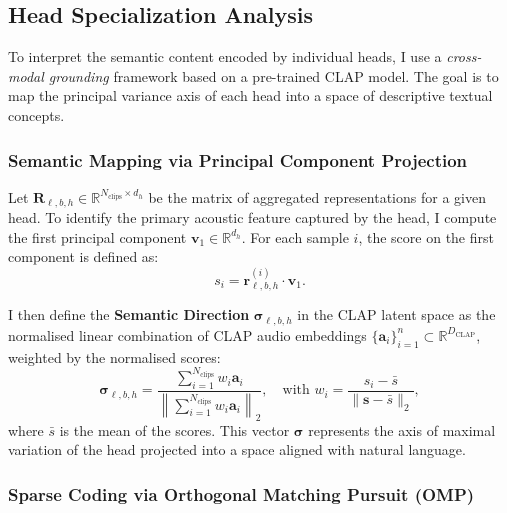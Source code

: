 \subsection{Head Specialization Analysis}
\label{sec:specialization_method}
 
To interpret the semantic content encoded by individual heads, I use a
\emph{cross-modal grounding} framework based on a pre-trained CLAP model.
The goal is to map the principal variance axis of each head into a space of
descriptive textual concepts.
 
\subsubsection{Semantic Mapping via Principal Component Projection}
 
Let $\mathbf{R}_{\ell,b,h} \in \mathbb{R}^{N_{\text{clips}} \times d_h}$ be the matrix of
aggregated representations for a given head. To identify the primary acoustic
feature captured by the head, I compute the first principal component
$\mathbf{v}_{1} \in \mathbb{R}^{d_h}$.
For each sample $i$, the score on the first component is defined as:
\begin{equation}
    s_{i} = \mathbf{r}_{\ell,b,h}^{(i)} \cdot \mathbf{v}_{1}.
\end{equation}
 
I then define the \textbf{Semantic Direction} $\mathbf{\sigma}_{\ell,b,h}$
in the CLAP latent space as the normalised linear combination of CLAP audio embeddings
$\{\mathbf{a}_i\}_{i=1}^n \subset \mathbb{R}^{D_{\mathrm{CLAP}}}$, weighted
by the normalised scores:
\begin{equation}
    \mathbf{\sigma}_{\ell,b,h} = 
    \frac{\displaystyle\sum_{i=1}^{N_{\text{clips}}} w_i \mathbf{a}_i}
         {\left\|\displaystyle\sum_{i=1}^{N_{\text{clips}}} w_i \mathbf{a}_i\right\|_2},
    \quad \text{with } w_i = \frac{s_i - \bar{s}}{\|\mathbf{s} - \bar{s}\|_2},
\end{equation}
where $\bar{s}$ is the mean of the scores. This vector $\mathbf{\sigma}$
represents the axis of maximal variation of the head projected into a space
aligned with natural language.
 
\subsubsection{Sparse Coding via Orthogonal Matching Pursuit (OMP)}
 
